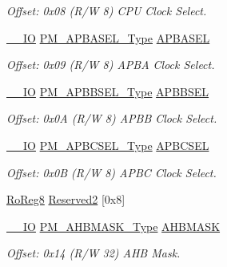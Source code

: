 \begin{DoxyCompactItemize}
\begin{DoxyCompactList}\small\item\em Offset\+: 0x08 (R/W 8) C\+PU Clock Select. \end{DoxyCompactList}\item 
\mbox{\hyperlink{core__cm0plus_8h_aec43007d9998a0a0e01faede4133d6be}{\+\_\+\+\_\+\+IO}} \mbox{\hyperlink{union_p_m___a_p_b_a_s_e_l___type}{P\+M\+\_\+\+A\+P\+B\+A\+S\+E\+L\+\_\+\+Type}} \mbox{\hyperlink{struct_pm_a126ebf68bf07133ba564588763a2f506}{A\+P\+B\+A\+S\+EL}}
\begin{DoxyCompactList}\small\item\em Offset\+: 0x09 (R/W 8) A\+P\+BA Clock Select. \end{DoxyCompactList}\item 
\mbox{\hyperlink{core__cm0plus_8h_aec43007d9998a0a0e01faede4133d6be}{\+\_\+\+\_\+\+IO}} \mbox{\hyperlink{union_p_m___a_p_b_b_s_e_l___type}{P\+M\+\_\+\+A\+P\+B\+B\+S\+E\+L\+\_\+\+Type}} \mbox{\hyperlink{struct_pm_adcd9c9b53db7ddf3ec3b5876295dcee3}{A\+P\+B\+B\+S\+EL}}
\begin{DoxyCompactList}\small\item\em Offset\+: 0x0A (R/W 8) A\+P\+BB Clock Select. \end{DoxyCompactList}\item 
\mbox{\hyperlink{core__cm0plus_8h_aec43007d9998a0a0e01faede4133d6be}{\+\_\+\+\_\+\+IO}} \mbox{\hyperlink{union_p_m___a_p_b_c_s_e_l___type}{P\+M\+\_\+\+A\+P\+B\+C\+S\+E\+L\+\_\+\+Type}} \mbox{\hyperlink{struct_pm_a72c4a54c8f24cfd9e31a8493a51a605e}{A\+P\+B\+C\+S\+EL}}
\begin{DoxyCompactList}\small\item\em Offset\+: 0x0B (R/W 8) A\+P\+BC Clock Select. \end{DoxyCompactList}\item 
\mbox{\hyperlink{group___s_a_m_d21_e15_a__definitions_ga0d957f1433aaf5d70e4dc2b68288442d}{Ro\+Reg8}} \mbox{\hyperlink{struct_pm_a8bdc4a639d3a39ae271ce60299b45c28}{Reserved2}} \mbox{[}0x8\mbox{]}
\item 
\mbox{\hyperlink{core__cm0plus_8h_aec43007d9998a0a0e01faede4133d6be}{\+\_\+\+\_\+\+IO}} \mbox{\hyperlink{union_p_m___a_h_b_m_a_s_k___type}{P\+M\+\_\+\+A\+H\+B\+M\+A\+S\+K\+\_\+\+Type}} \mbox{\hyperlink{struct_pm_a407d2530ed58b32aa72362a2a19f5a6b}{A\+H\+B\+M\+A\+SK}}
\begin{DoxyCompactList}\small\item\em Offset\+: 0x14 (R/W 32) A\+HB Mask. \end{DoxyCompactList}\item 

\end{DoxyCompactItemize}
